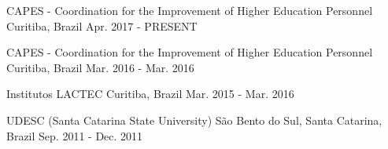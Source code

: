 
\begin{cventries}
	
	\cventry
	{} %
	{CAPES - Coordination for the Improvement of Higher Education Personnel} %
	{Curitiba, Brazil} %
	{Apr. 2017 - PRESENT} %
	{
	}
	
	
	\cventry
	{} %
	{CAPES - Coordination for the Improvement of Higher Education Personnel} %
	{Curitiba, Brazil} %
	{Mar. 2016 - Mar. 2016} %
	{
	}
	
	\cventry
	{} %
	{Institutos LACTEC} %
	{Curitiba, Brazil} %
	{Mar. 2015 - Mar. 2016} %
	{}
	
	\cventry
	{} %
	{UDESC (Santa Catarina State University)} %
	{São Bento do Sul, Santa Catarina, Brazil} %
	{Sep. 2011 - Dec. 2011} %
	{
	}
	
\end{cventries}
		